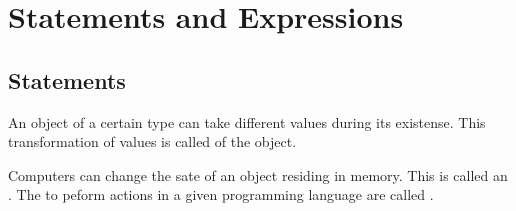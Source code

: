 \documentclass[a4paper,10pt,english]{jupyterBook}
\begin{document}
\begin{sphinxVerbatim}[commandchars=\\\{\}]


\end{sphinxVerbatim}

\sphinxstepscope


\section{Statements and Expressions}
\label{\detokenize{text/progtut/statements:statements-and-expressions}}\label{\detokenize{text/progtut/statements::doc}}

\subsection{Statements}
\label{\detokenize{text/progtut/statements:statements}}
\sphinxAtStartPar
An object of a certain type can take different values during its existense. This transformation of values is called  of the object.

\sphinxAtStartPar
Computers can change the sate of an object residing in memory. This is called an . The  to peform actions in a given programming language are called .
\end{document}
